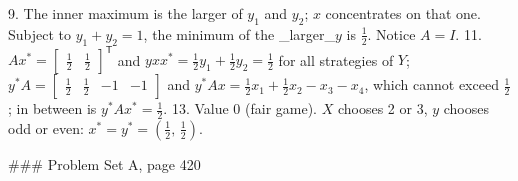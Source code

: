 9. The inner maximum is the larger of \(y_{1}\) and \(y_{2}\); \(x\) concentrates on that one. Subject to \(y_{1}+y_{2}=1\), the minimum of the _larger_\(y\) is \(\frac{1}{2}\). Notice \(A=I\).
11. \(Ax^{\ast}=\begin{bmatrix}\frac{1}{2}&\frac{1}{2}\end{bmatrix}^{\mathsf{T}}\) and \(yxx^{\ast}=\frac{1}{2}y_{1}+\frac{1}{2}y_{2}=\frac{1}{2}\) for all strategies of \(Y\); \(y^{\ast}A=\begin{bmatrix}\frac{1}{2}&\frac{1}{2}&-1&-1\end{bmatrix}\) and \(y^{\ast}Ax=\frac{1}{2}x_{1}+\frac{1}{2}x_{2}-x_{3}-x_{4}\), which cannot exceed \(\frac{1}{2}\); in between is \(y^{\ast}Ax^{\ast}=\frac{1}{2}\).
13. Value 0 (fair game). \(X\) chooses 2 or 3, \(y\) chooses odd or even: \(x^{\ast}=y^{\ast}=\left(\frac{1}{2},\,\frac{1}{2}\right)\).

### Problem Set A, page 420


